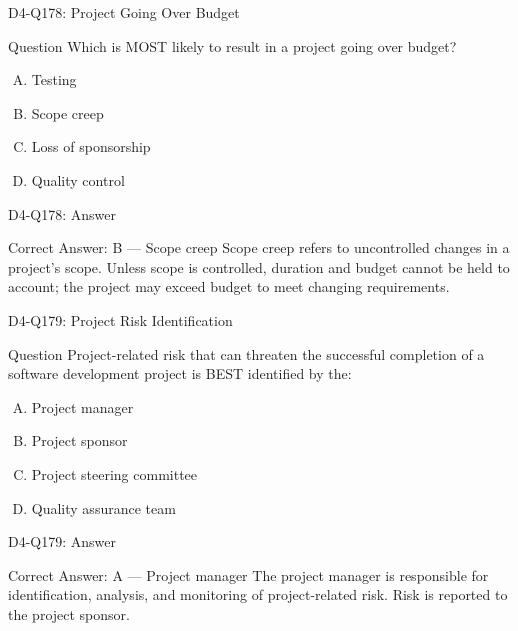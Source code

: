 \documentclass{beamer}
\begin{document}
	\begin{frame}{D4-Q178: Project Going Over Budget}
		\begin{block}{Question}
			Which is MOST likely to result in a project going over budget?
		\end{block}
		\begin{enumerate}[(A)]
			\item Testing
			\item Scope creep
			\item Loss of sponsorship
			\item Quality control
		\end{enumerate}
	\end{frame}
	\begin{frame}{D4-Q178: Answer}
		\begin{block}{Correct Answer: B --- Scope creep}
			Scope creep refers to uncontrolled changes in a project's scope. Unless scope is controlled, duration and budget cannot be held to account; the project may exceed budget to meet changing requirements.
		\end{block}
	\end{frame}
	
	\begin{frame}{D4-Q179: Project Risk Identification}
		\begin{block}{Question}
			Project-related risk that can threaten the successful completion of a software development project is BEST identified by the:
		\end{block}
		\begin{enumerate}[(A)]
			\item Project manager
			\item Project sponsor
			\item Project steering committee
			\item Quality assurance team
		\end{enumerate}
	\end{frame}
	\begin{frame}{D4-Q179: Answer}
		\begin{block}{Correct Answer: A --- Project manager}
			The project manager is responsible for identification, analysis, and monitoring of project-related risk. Risk is reported to the project sponsor.
		\end{block}
	\end{frame}
	
\end{document}

